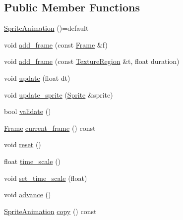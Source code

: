\subsection*{Public Member Functions}
\begin{DoxyCompactItemize}
\item 
\hyperlink{classpixel_1_1graphics_1_1_sprite_animation_ab1c074091cc2bd6bea22a8a953b56147}{Sprite\+Animation} ()=default
\item 
void \hyperlink{classpixel_1_1graphics_1_1_sprite_animation_a72ae44e2b74a11e2b0784117b1882bac}{add\+\_\+frame} (const \hyperlink{structpixel_1_1graphics_1_1_sprite_animation_1_1_frame}{Frame} \&f)
\item 
void \hyperlink{classpixel_1_1graphics_1_1_sprite_animation_a9befb6c2c329a6e6d02228ad8c965479}{add\+\_\+frame} (const \hyperlink{structpixel_1_1graphics_1_1_texture_region}{Texture\+Region} \&t, float duration)
\item 
void \hyperlink{classpixel_1_1graphics_1_1_sprite_animation_acee7921b1fe62d6201153646d3f3983f}{update} (float dt)
\item 
void \hyperlink{classpixel_1_1graphics_1_1_sprite_animation_a2384eac2218317e13f2612762ef7e31a}{update\+\_\+sprite} (\hyperlink{classpixel_1_1graphics_1_1_sprite}{Sprite} \&sprite)
\item 
bool \hyperlink{classpixel_1_1graphics_1_1_sprite_animation_a5bc6717d32d7e5ae1a70bf984c4d4c10}{validate} ()
\item 
\hyperlink{structpixel_1_1graphics_1_1_sprite_animation_1_1_frame}{Frame} \hyperlink{classpixel_1_1graphics_1_1_sprite_animation_a2dea97818dcf960df3375c0070f8e0e4}{current\+\_\+frame} () const
\item 
void \hyperlink{classpixel_1_1graphics_1_1_sprite_animation_aeef56bcc96c4af271d994c72d5baa1cf}{reset} ()
\item 
float \hyperlink{classpixel_1_1graphics_1_1_sprite_animation_ac86602435202ae22b2961c7bb0c47694}{time\+\_\+scale} ()
\item 
void \hyperlink{classpixel_1_1graphics_1_1_sprite_animation_a4615c583f1633927dba306659ddb6972}{set\+\_\+time\+\_\+scale} (float)
\item 
void \hyperlink{classpixel_1_1graphics_1_1_sprite_animation_aeb00982221f4c5ebd081d7c764d0c2a6}{advance} ()
\item 
\hyperlink{classpixel_1_1graphics_1_1_sprite_animation}{Sprite\+Animation} \hyperlink{classpixel_1_1graphics_1_1_sprite_animation_a9645ce48ccaf3a207038a9bb61373f68}{copy} () const
\end{DoxyCompactItemize}
